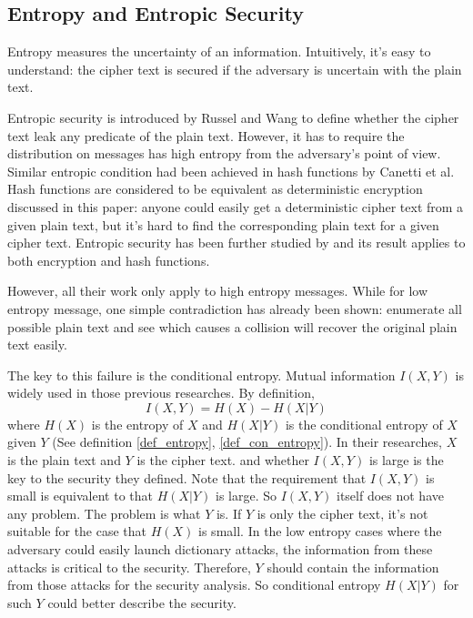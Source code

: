 \documentclass[10pt, conference, compsocconf]{IEEEtran}
\begin{document}
	\subsection{Entropy and Entropic Security}
	Entropy\cite{entropy} measures the uncertainty of an information. Intuitively, it's easy to
	understand: the cipher text is secured
	if the adversary is uncertain with the plain text.
	
	Entropic security is introduced by Russel and Wang\cite{Russel02howto} to define
	whether the cipher text leak any predicate of the plain text. However,
	it has to require the distribution on messages has high entropy from
	the adversary's point of view. Similar entropic condition had been
	achieved in hash functions by Canetti et al\cite{Canetti97towardsrealizing, Canetti_perfectlyone-way}. 
	Hash functions are
	considered to be equivalent as deterministic encryption discussed in this
	paper: anyone could easily get a deterministic cipher text from a
	given plain text, but it's hard to find the corresponding plain text
	for a given cipher text. Entropic security has been further 
	studied by \cite{entropic_wang}
	and its result applies to both encryption and hash functions.
	
	However, all their work only apply to high entropy messages.
	While for low entropy message, 
	one simple contradiction has already been
	shown: enumerate all possible plain text and see which causes a collision
	will recover the original plain text easily.
	
	The key to this failure is the conditional entropy. Mutual information
	$I(X, Y)$ is widely used in those previous researches. By definition,
	\begin{equation}
		I(X, Y) = H(X) - H(X|Y)
	\end{equation}
	where $H(X)$ is the entropy of $X$ and $H(X|Y)$ is the conditional entropy
	of $X$ given $Y$ (See definition \ref{def_entropy}, \ref{def_con_entropy}).
	In their researches, $X$ is the plain text and $Y$ is the cipher text.
	and whether $I(X, Y)$ is large is the key to the security they defined.
	Note that the requirement that $I(X, Y)$ is small
	is equivalent to that $H(X|Y)$ is large. So $I(X, Y)$ itself does not have any problem.
	The problem is what $Y$ is.
	If $Y$ is only the cipher text, it's not suitable for the case that $H(X)$ is small.
	In the low entropy cases where the adversary could easily launch dictionary attacks,
	the information from these attacks is critical to the security. Therefore, $Y$
	should contain the information from those attacks for the security analysis.
	So conditional entropy $H(X|Y)$ for such $Y$ could better describe the security. 
		
\end{document}
